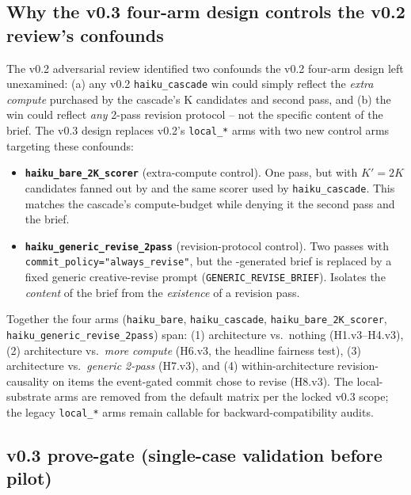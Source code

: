 \subsection{Why the v0.3 four-arm design controls the v0.2 review's confounds}\label{sec:bench-fairness}

The v0.2 adversarial review identified two confounds the v0.2 four-arm design left unexamined: (a) any v0.2 \texttt{haiku\_cascade} win could simply reflect the \emph{extra compute} purchased by the cascade's K candidates and second pass, and (b) the win could reflect \emph{any} 2-pass revision protocol -- not the specific content of the  brief. The v0.3 design replaces v0.2's \texttt{local\_*} arms with two new control arms targeting these confounds:

\begin{itemize}[leftmargin=1.4em]
\item \textbf{\texttt{haiku\_bare\_2K\_scorer}} (extra-compute control). One pass, but with $K' = 2K$ candidates fanned out by  and the same  scorer used by \texttt{haiku\_cascade}. This matches the cascade's compute-budget while denying it the second pass and the  brief.
\item \textbf{\texttt{haiku\_generic\_revise\_2pass}} (revision-protocol control). Two passes with \texttt{commit\_policy="always\_revise"}, but the -generated brief is replaced by a fixed generic creative-revise prompt (\texttt{GENERIC\_REVISE\_BRIEF}). Isolates the \emph{content} of the brief from the \emph{existence} of a revision pass.
\end{itemize}

Together the four arms (\texttt{haiku\_bare}, \texttt{haiku\_cascade}, \texttt{haiku\_bare\_2K\_scorer}, \texttt{haiku\_generic\_revise\_2pass}) span: (1) architecture vs.\ nothing (H1.v3--H4.v3), (2) architecture vs.\ \emph{more compute} (H6.v3, the headline fairness test), (3) architecture vs.\ \emph{generic 2-pass} (H7.v3), and (4) within-architecture revision-causality on items the event-gated commit chose to revise (H8.v3). The local-substrate arms are removed from the default matrix per the locked v0.3 scope; the legacy \texttt{local\_*} arms remain callable for backward-compatibility audits.

\subsection{v0.3 prove-gate (single-case validation before pilot)}


